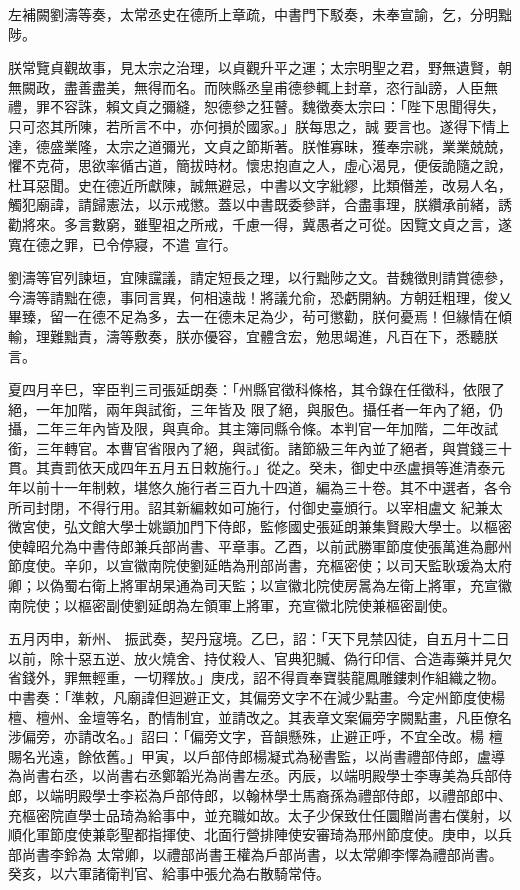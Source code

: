 \begin{pinyinscope}
 左補闕劉濤等奏，太常丞史在德所上章疏，中書門下駁奏，未奉宣諭，乞，分明黜陟。



 朕常覽貞觀故事，見太宗之治理，以貞觀升平之運；太宗明聖之君，野無遺賢，朝無闕政，盡善盡美，無得而名。而陜縣丞皇甫德參輒上封章，恣行訕謗，人臣無禮，罪不容誅，賴文貞之彌縫，恕德參之狂瞽。魏徵奏太宗曰：「陛下思聞得失，只可恣其所陳，若所言不中，亦何損於國家。」朕每思之，誠
 要言也。遂得下情上達，德盛業隆，太宗之道彌光，文貞之節斯著。朕惟寡昧，獲奉宗祧，業業兢兢，懼不克荷，思欲率循古道，簡拔時材。懷忠抱直之人，虛心渴見，便佞詭隨之說，杜耳惡聞。史在德近所獻陳，誠無避忌，中書以文字紕繆，比類僭差，改易人名，觸犯廟諱，請歸憲法，以示戒懲。蓋以中書既委參詳，合盡事理，朕纘承前緒，誘勸將來。多言數窮，雖聖祖之所戒，千慮一得，冀愚者之可從。因覽文貞之言，遂寬在德之罪，已令停寢，不遣
 宣行。



 劉濤等官列諫垣，宜陳讜議，請定短長之理，以行黜陟之文。昔魏徵則請賞德參，今濤等請黜在德，事同言異，何相遠哉！將議允俞，恐虧開納。方朝廷粗理，俊乂畢臻，留一在德不足為多，去一在德未足為少，茍可懲勸，朕何憂焉！但緣情在傾輸，理難黜責，濤等敷奏，朕亦優容，宜體含宏，勉思竭進，凡百在下，悉聽朕言。



 夏四月辛巳，宰臣判三司張延朗奏：「州縣官徵科條格，其令錄在任徵科，依限了絕，一年加階，兩年與試銜，三年皆及
 限了絕，與服色。攝任者一年內了絕，仍攝，二年三年內皆及限，與真命。其主簿同縣令條。本判官一年加階，二年改試銜，三年轉官。本曹官省限內了絕，與試銜。諸節級三年內並了絕者，與賞錢三十貫。其責罰依天成四年五月五日敕施行。」從之。癸未，御史中丞盧損等進清泰元年以前十一年制敕，堪悠久施行者三百九十四道，編為三十卷。其不中選者，各令所司封閉，不得行用。詔其新編敕如可施行，付御史臺頒行。以宰相盧文
 紀兼太微宮使，弘文館大學士姚顗加門下侍郎，監修國史張延朗兼集賢殿大學士。以樞密使韓昭允為中書侍郎兼兵部尚書、平章事。乙酉，以前武勝軍節度使張萬進為鄜州節度使。辛卯，以宣徽南院使劉延皓為刑部尚書，充樞密使；以司天監耿瑗為太府卿；以偽蜀右衛上將軍胡杲通為司天監；以宣徽北院使房暠為左衛上將軍，充宣徽南院使；以樞密副使劉延朗為左領軍上將軍，充宣徽北院使兼樞密副使。



 五月丙申，新州、
 振武奏，契丹寇境。乙巳，詔：「天下見禁囚徒，自五月十二日以前，除十惡五逆、放火燒舍、持仗殺人、官典犯贓、偽行印信、合造毒藥并見欠省錢外，罪無輕重，一切釋放。」庚戌，詔不得貢奉寶裝龍鳳雕鏤刺作組織之物。中書奏：「準敕，凡廟諱但迴避正文，其偏旁文字不在減少點畫。今定州節度使楊檀、檀州、金壇等名，酌情制宜，並請改之。其表章文案偏旁字闕點畫，凡臣僚名涉偏旁，亦請改名。」詔曰：「偏旁文字，音韻懸殊，止避正呼，不宜全改。楊
 檀賜名光遠，餘依舊。」甲寅，以戶部侍郎楊凝式為秘書監，以尚書禮部侍郎，盧導為尚書右丞，以尚書右丞鄭韜光為尚書左丞。丙辰，以端明殿學士李專美為兵部侍郎，以端明殿學士李崧為戶部侍郎，以翰林學士馬裔孫為禮部侍郎，以禮部郎中、充樞密院直學士品琦為給事中，並充職如故。太子少保致仕任圜贈尚書右僕射，以順化軍節度使兼彰聖都指揮使、北面行營排陣使安審琦為邢州節度使。庚申，以兵部尚書李鈴為
 太常卿，以禮部尚書王權為戶部尚書，以太常卿李懌為禮部尚書。癸亥，以六軍諸衛判官、給事中張允為右散騎常侍。




\end{pinyinscope}
